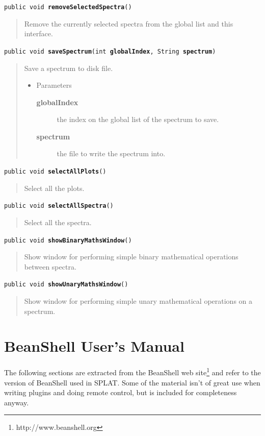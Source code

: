 \documentclass[twoside,11pt]{article}
\newcommand{\htmladdnormallinkfoot}[2]{#1\footnote{#2}}
\renewcommand{\_}{\texttt{\symbol{95}}}
\newcommand{\SPLAT}{\textsf{SPLAT}}
\newcommand{\method}[1]{\texttt{#1}}
\newenvironment{desc}{\begin{quote}}{\end{quote}}
\begin{document}
\method{public void \textbf{removeSelectedSpectra}()\label{l370}\label{l371}}
\begin{desc}Remove the currently selected spectra from the global list and
 this interface.
\end{desc}

\method{public void \textbf{saveSpectrum}(\texttt{int} \textbf{globalIndex}, \texttt{String} \textbf{spectrum})\label{l372}\label{l373}}
\begin{desc}Save a spectrum to disk file.
\begin{itemize}
\item{Parameters
  \begin{description}
   \item[\textbf{globalIndex}]{the index on the global list of the spectrum
                    to save.}
   \item[\textbf{spectrum}]{the file to write the spectrum into.}
  \end{description}}
\end{itemize}
\end{desc}

\method{public void \textbf{selectAllPlots}()\label{l374}\label{l375}}
\begin{desc}Select all the plots.
\end{desc}

\method{public void \textbf{selectAllSpectra}()\label{l376}\label{l377}}
\begin{desc}Select all the spectra.
\end{desc}

\method{public void \textbf{showBinaryMathsWindow}()\label{l378}\label{l379}}
\begin{desc}Show window for performing simple binary mathematical
 operations between spectra.
\end{desc}

\method{public void \textbf{showUnaryMathsWindow}()\label{l380}\label{l381}}
\begin{desc}Show window for performing simple unary mathematical
 operations on a spectrum.
\end{desc}

\section{\label{beanshell_appendix}BeanShell User's Manual}

The following sections are extracted from the BeanShell
\htmladdnormallinkfoot{web site}{http://www.beanshell.org} and
refer to the version of BeanShell used in \SPLAT. Some of the material
isn't of great use when writing plugins and doing remote control, but
is included for completeness anyway.
\end{document}
